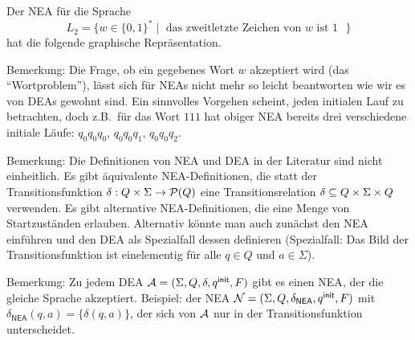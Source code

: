 \begin{Bsp}
\label{bsp:2.zweitletztes} Der \acs*{NEA} für die Sprache 
$$L_2=\{w\in\{0,1\}^*\mid \text{ das zweitletzte Zeichen von $w$ ist $1$ }\}$$ hat die folgende graphische Repräsentation.
  \begin{center}
  \end{center}
\end{Bsp}


Bemerkung: Die Frage, ob ein gegebenes Wort $w$ akzeptiert wird (das "`Wortproblem"'), lässt sich für \acs*{NEA}s nicht mehr so leicht beantworten wie wir es von \acs*{DEA}s gewohnt sind.
Ein sinnvolles Vorgehen scheint, jeden initialen Lauf zu betrachten, doch z.B.\ für das Wort $111$ hat obiger \acs*{NEA} bereits  drei verschiedene initiale Läufe: $q_0q_0q_0$, $q_0q_0q_1$, $q_0q_0q_2$.


Bemerkung: Die Definitionen von \ac{NEA} und \ac{DEA} in der Literatur sind nicht einheitlich. 
Es gibt äquivalente \ac{NEA}-Definitionen, die statt der Transitionsfunktion $\delta:Q\x\Sigma\->\mathcal{P}(Q)$ eine Transitionsrelation $\delta\subseteq Q\times\Sigma\times Q$ verwenden.
Es gibt alternative \ac{NEA}-Definitionen, die eine Menge von Startzuständen erlauben.
Alternativ könnte man auch zunächst den \ac{NEA} einführen und den \ac{DEA} als Spezialfall dessen definieren (Spezialfall: Das Bild der Transitionsfunktion ist einelementig für alle $q\in Q$ und $a\in\Sigma$).

Bemerkung: Zu jedem \ac{DEA} $\mathcal{A}= (\Sigma, Q,\delta,q^\mathsf{init},F)$ gibt es einen \ac{NEA}, der die gleiche Sprache akzeptiert.
Beispiel: der \ac{NEA} $\mathcal{N}= (\Sigma, Q,\delta_\mathsf{NEA},q^\mathsf{init},F)$ mit $\delta_\mathsf{NEA}(q,a)=\{\delta(q,a)\}$, der sich von $\mathcal{A}$ nur in der Transitionsfunktion unterscheidet.


